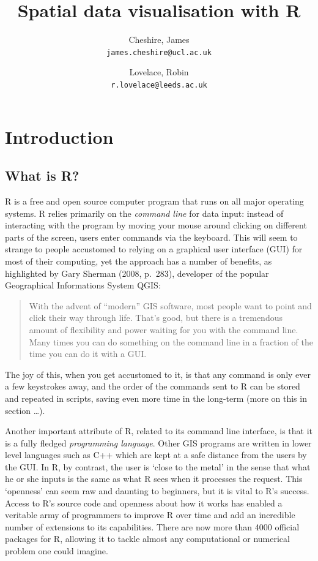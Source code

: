 \documentclass[]{article}
\author{
Cheshire, James\\
\texttt{james.cheshire@ucl.ac.uk}
\and
Lovelace, Robin\\
\texttt{r.lovelace@leeds.ac.uk}
}
\title{Spatial data visualisation with R}
\begin{document}
\maketitle

\section{Introduction}

\subsection{What is R?}

R is a free and open source computer program that runs on all major
operating systems. R relies primarily on the \emph{command line} for
data input: instead of interacting with the program by moving your mouse
around clicking on different parts of the screen, users enter commands
via the keyboard. This will seem to strange to people accustomed to
relying on a graphical user interface (GUI) for most of their computing,
yet the approach has a number of benefits, as highlighted by Gary
Sherman (2008, p.~283), developer of the popular Geographical
Informations System QGIS:

\begin{quote}
With the advent of ``modern'' GIS software, most people want to point
and click their way through life. That's good, but there is a tremendous
amount of flexibility and power waiting for you with the command line.
Many times you can do something on the command line in a fraction of the
time you can do it with a GUI.

\end{quote}
The joy of this, when you get accustomed to it, is that any command is
only ever a few keystrokes away, and the order of the commands sent to R
can be stored and repeated in scripts, saving even more time in the
long-term (more on this in section \ldots{}).

Another important attribute of R, related to its command line interface,
is that it is a fully fledged \emph{programming language}. Other GIS
programs are written in lower level languages such as C++ which are kept
at a safe distance from the users by the GUI. In R, by contrast, the
user is `close to the metal' in the sense that what he or she inputs is
the same as what R sees when it processes the request. This `openness'
can seem raw and daunting to beginners, but it is vital to R's success.
Access to R's source code and openness about how it works has enabled a
veritable army of programmers to improve R over time and add an
incredible number of extensions to its capabilities. There are now more
than 4000 official packages for R, allowing it to tackle almost any
computational or numerical problem one could imagine.
\end{document}
